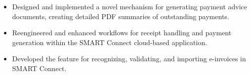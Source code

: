 \begin{minipage}{\linewidth}
\begin{itemize}
  \item Designed and implemented a novel mechanism for generating payment advice documents, creating detailed PDF summaries of outstanding payments.
  \item Reengineered and enhanced workflows for receipt handling and payment generation within the SMART Connect cloud-based application.
  \item Developed the feature for recognizing, validating, and importing e-invoices in SMART Connect.
\end{itemize}
\end{minipage}
\divider
